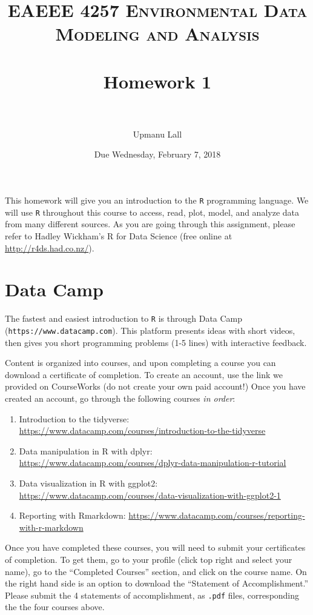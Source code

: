 \documentclass[paper=letter, fontsize=11pt]{scrartcl}
\title{
\normalfont \normalsize
\textsc{EAEEE 4257 Environmental Data Modeling and Analysis} \\ [25pt] %
\horrule{0.5pt} \\[0.4cm] %
\huge Homework 1 \\ %
\horrule{2pt} \\[0.5cm] %
}
\author{Upmanu Lall} %
\date{\normalsize Due Wednesday, February 7, 2018}
\numberwithin{equation}{section}
\numberwithin{figure}{section}
\numberwithin{table}{section}
\begin{document}
\maketitle


This homework will give you an introduction to the \texttt{R} programming language.
We will use \texttt{R} throughout this course to access, read, plot, model, and analyze data from many different sources.
As you are going through this assignment, please refer to Hadley Wickham's R for Data Science (free online at \url{http://r4ds.had.co.nz/}).

\section{Data Camp}

The fastest and easiest introduction to \texttt{R} is through Data Camp (\texttt{https://www.datacamp.com}).
This platform presents ideas with short videos, then gives you short programming problems (1-5 lines) with interactive feedback.

Content is organized into courses, and upon completing a course you can download a certificate of completion.
To create an account, use the link we provided on CourseWorks (do not create your own paid account!)
Once you have created an account, go through the following courses \emph{in order}:
\begin{enumerate}
  \item Introduction to the tidyverse: \url{https://www.datacamp.com/courses/introduction-to-the-tidyverse}
  \item Data manipulation in R with dplyr: \url{https://www.datacamp.com/courses/dplyr-data-manipulation-r-tutorial}
  \item  Data visualization in R with ggplot2: \url{https://www.datacamp.com/courses/data-visualization-with-ggplot2-1}
  \item Reporting with Rmarkdown: \url{https://www.datacamp.com/courses/reporting-with-r-markdown}
\end{enumerate}
Once you have completed these courses, you will need to submit your certificates of completion.
To get them, go to your profile (click top right and select your name), go to the ``Completed Courses'' section, and click on the course name.
On the right hand side is an option to download the ``Statement of Accomplishment.''
Please submit the 4 statements of accomplishment, as \texttt{.pdf} files, corresponding the the four courses above.
\end{document}
